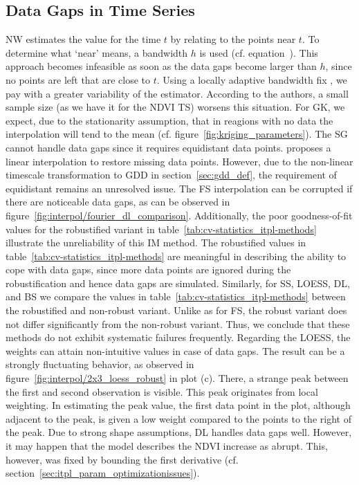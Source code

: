 {    \subsection{Data Gaps in Time Series}\label{sec:discussion_itpl_data_gaps}{
        NW estimates the value for the time $t$ by relating to the points near $t$. To determine what `near' means, a bandwidth $h$ is used (cf. equation~). This approach becomes infeasible as soon as the data gaps become larger than $h$, since no points are left that are close to $t$. Using a locally adaptive bandwidth fix \citep{brockmannLocallyAdaptiveBandwidth1993}, we pay with a greater variability of the estimator. According to the authors, a small sample size (as we have it for the NDVI TS) worsens this situation. 
        For GK, we expect, due to the stationarity assumption, that in reagions with no data the interpolation will tend to the mean (cf. figure~\ref{fig:kriging_parameters}). 
        The SG cannot handle data gaps since it requires equidistant data points. \cite{chenSimpleMethodReconstructing2004a} proposes a linear interpolation to restore missing data points. However, due to the non-linear timescale transformation to GDD in section~\ref{sec:gdd_def}, the requirement of equidistant remains an unresolved issue.
        The FS interpolation can be corrupted if there are noticeable data gaps, as can be observed in figure~\ref{fig:interpol/fourier_dl_comparison}.  Additionally, the poor goodness-of-fit values for the robustified variant in table~\ref{tab:cv-statistics_itpl-methods} illustrate the unreliability of this IM method.
        The robustified values in table~\ref{tab:cv-statistics_itpl-methods} are meaningful in describing the ability to cope with data gaps, since more data points are ignored during the robustification and hence data gaps are simulated. 
        Similarly, for SS, LOESS, DL, and BS we compare the values in table~\ref{tab:cv-statistics_itpl-methods} between the robustified and non-robust variant. Unlike as for FS, the robust variant does not differ significantly from the non-robust variant. Thus, we conclude that these methods do not exhibit systematic failures frequently.
        Regarding the LOESS, the weights can attain non-intuitive values in case of data gaps. The result can be a strongly fluctuating behavior, as observed in figure~\ref{fig:interpol/2x3_loess_robust} in plot (c). There, a strange peak between the first and second observation is visible. This peak originates from local weighting. In estimating the peak value, the first data point in the plot, although adjacent to the peak, is given a low weight compared to the points to the right of the peak.
        Due to strong shape assumptions, DL handles data gaps well. However, it may happen that the model describes the NDVI increase as abrupt. This, however, was fixed by bounding the first derivative (cf. section~\ref{sec:itpl_param_optimizationissues}).
    }

}
